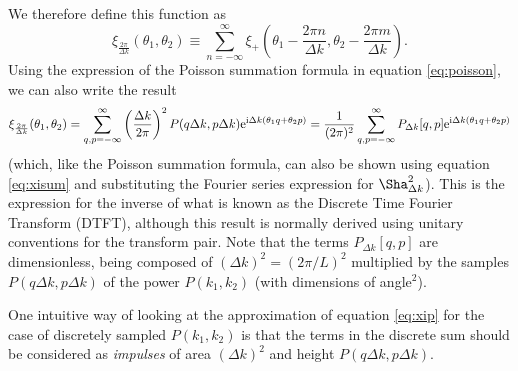 \documentclass[preprint]{aastex}
\newcommand{\mi}{{\rm i}}
\newcommand{\me}{{\rm e}}
\begin{document}
We therefore define this function as
\begin{equation}
\xi_{\frac{2\pi}{\Delta k}}(\theta_1, \theta_2) \equiv \sum_{n = -\infty}^{\infty} \xi_+\left(\theta_1
- \frac{2 \pi n}{\Delta k},  \theta_2
- \frac{2 \pi m}{\Delta k} \right).
\end{equation}
Using the expression of the Poisson summation formula in equation
\eqref{eq:poisson}, we can also write the result
\begin{equation}
\xi_{\frac{2\pi}{\Delta k}}(\theta_1, \theta_2) =
\sum_{q,p=-\infty}^{\infty} \left( \frac{\Delta k}{2 \pi} \right)^2 P(q \Delta k, p \Delta k) \me^{\mi \Delta
  k (\theta_1 q + \theta_2 p)} = \frac{1}{( 2 \pi)^2}
\sum_{q,p=-\infty}^{\infty} P_{\Delta k} [q, p] \me^{\mi \Delta
  k (\theta_1 q + \theta_2 p)} \label{eq:dtft} 
\end{equation}
(which, like the Poisson summation formula, can also be shown using
equation \eqref{eq:xisum} and substituting the Fourier series expression
for $\Sha^2_{\Delta k}$).  This is the expression for the inverse of
what is known as the Discrete Time Fourier Transform (DTFT), although
this result is normally derived using unitary conventions for the
transform pair.  Note that the terms $P_{\Delta k}[q, p]$ are
dimensionless, being composed of $(\Delta k)^2 = (2 \pi / L)^2$
multiplied by the samples $P(q \Delta k, p \Delta k)$ of the power
$P(k_1, k_2)$ (with dimensions of angle$^2$).

One intuitive way of looking at the approximation of equation \eqref{eq:xip} for the case of discretely
sampled $P(k_1, k_2)$ is that the terms in the discrete sum should be
considered as \emph{impulses} of area $(\Delta k)^2$ and height $P(q \Delta k, p \Delta k)$.
\end{document}
